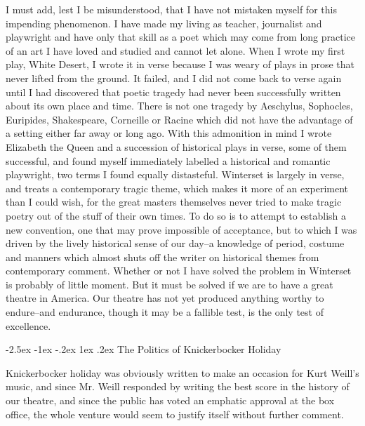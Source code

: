 \documentclass[9pt,twoside]{extarticle}
\makeatletter
\renewcommand\section{\@startsection{section}{1}{\z@}%
  {-2.5ex \@plus -1ex \@minus -.2ex}%
  {1ex \@plus .2ex}%
  {\itshape\normalsize}}
\makeatother
\begin{document}
I must add, lest I be misunderstood, that I have not mistaken myself for this impending phenomenon. I have made my living as teacher, journalist and playwright and have only that skill as a poet which may come from long practice of an art I have loved and studied and cannot let alone. When I wrote my first play, White Desert, I wrote it in verse because I was weary of plays in prose that never lifted from the ground. It failed, and I did not come back to verse again until I had discovered that poetic tragedy had never been successfully written about its own place and time. There is not one tragedy by Aeschylus, Sophocles, Euripides, Shakespeare, Corneille or Racine which did not have the advantage of a setting either far away or long ago. With this admonition in mind I wrote Elizabeth the Queen and a succession of historical plays in verse, some of them successful, and found myself immediately labelled a historical and romantic playwright, two terms I found equally distasteful. Winterset is largely in verse, and treats a contemporary tragic theme, which makes it more of an experiment than I could wish, for the great masters themselves never tried to make tragic poetry out of the stuff of their own times. To do so is to attempt to establish a new convention, one that may prove impossible of acceptance, but to which I was driven by the lively historical sense of our day--a knowledge of period, costume and manners which almost shuts off the writer on historical themes from contemporary comment. Whether or not I have solved the problem in Winterset is probably of little moment. But it must be solved if we are to have a great theatre in America. Our theatre has not yet produced anything worthy to endure--and endurance, though it may be a fallible test, is the only test of excellence.

\newpage
\section{The Politics of Knickerbocker Holiday}

Knickerbocker holiday was obviously written to make an occasion for Kurt Weill's music, and since Mr. Weill responded by writing the best score in the history of our theatre, and since the public has voted an emphatic approval at the box office, the whole venture would seem to justify itself without further comment.
\end{document}
